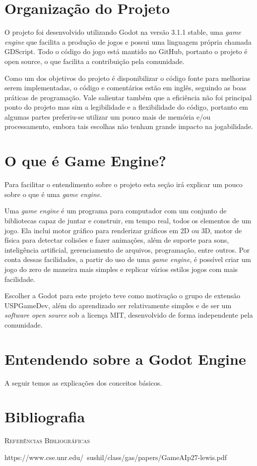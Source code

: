 \section{Organização do Projeto}
\label{sec:consideracoes_preliminares}

O projeto foi desenvolvido utilizando Godot na versão 3.1.1 stable, 
uma \textit{game engine} que facilita a produção de jogos e possui uma linguagem
própria chamada GDScript.
Todo o código do jogo está mantido no GitHub, portanto o projeto é open source,
o que facilita a contribuição pela comunidade.

Como um dos objetivos do projeto é disponibilizar o código fonte para
melhorias serem implementadas, o código e comentários estão em inglês, seguindo
as boas práticas de programação. Vale salientar também que a eficiência não foi
principal ponto do projeto mas sim a legibilidade e a flexibilidade do 
código, portanto em algumas partes preferiu-se utilizar um pouco mais de memória
e/ou processamento, embora tais escolhas não tenham grande impacto na 
jogabilidade.

\section{O que é Game Engine?}

Para facilitar o entendimento sobre o projeto esta seção irá explicar um pouco
sobre o que é uma \textit{game engine}.

Uma \textit{game engine} é um programa para computador com um conjunto de 
bibliotecas capaz de juntar e construir, em tempo real, todos os elementos de um
jogo.
Ela inclui motor gráfico para renderizar gráficos em 2D ou 3D, motor de física 
para detectar colisões e fazer animações, além de suporte para sons, 
inteligência artificial, gerenciamento de arquivos, programação, entre outros.
Por conta dessas facilidades, a partir do uso de uma \textit{game engine}, é 
possível criar um jogo do zero de maneira mais simples e replicar vários estilos
jogos com mais facilidade.

Escolher a Godot para este projeto teve como motivação o grupo de extensão 
USPGameDev, além do aprendizado ser relativamente simples e de ser um 
\textit{software open source} sob a licença MIT, desenvolvido de forma 
independente pela comunidade.

\section{Entendendo sobre a Godot Engine}

A seguir temos as explicações dos conceitos básicos.




\section{Bibliografia}

\textsc{Referências Bibliográficas} 

https://www.cse.unr.edu/~sushil/class/gas/papers/GameAIp27-lewis.pdf
